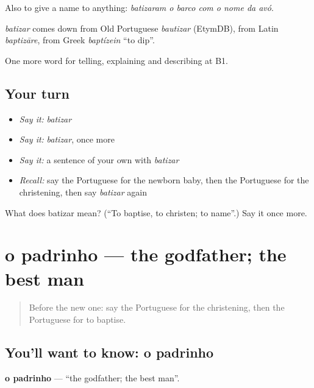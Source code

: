 Also to give a name to anything: \emph{batizaram o barco com o nome da avó}.

\begin{cousinweb}
\emph{batizar} comes down from Old Portuguese \emph{bautizar} (EtymDB), from Latin \emph{baptizāre}, from Greek \emph{baptízein} \textquotedblleft{}to dip\textquotedblright{}.
\end{cousinweb}

\begin{grammarlens}[title={What you've built}]
One more word for telling, explaining and describing at B1.
\end{grammarlens}

\subsection*{Your turn}
\begin{itemize}
\raggedright
  \item \emph{Say it:} \emph{batizar}
  \item \emph{Say it:} \emph{batizar}, once more
  \item \emph{Say it:} a sentence of your own with \emph{batizar}
  \item \emph{Recall:} say the Portuguese for the newborn baby, then the Portuguese for the christening, then say \emph{batizar} again
\end{itemize}

\begin{tcolorbox}[breakable,colback=teal!4,colframe=teal!35!black,title={Before you move on}]
What does batizar mean? (\textquotedblleft{}To baptise, to christen; to name\textquotedblright{}.) Say it once more.
\end{tcolorbox}
\section[o padrinho]{o padrinho — the godfather; the best man}

\label{lesson:PT-C310-padrinho}



\begin{quote}
Before the new one: say the Portuguese for the christening, then the Portuguese for to baptise.
\end{quote}

\subsection*{You'll want to know: o padrinho}
\textbf{o padrinho} — \textquotedblleft{}the godfather; the best man\textquotedblright{}.

